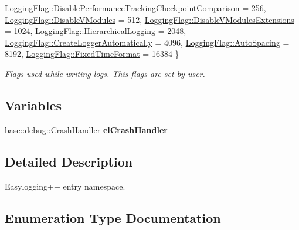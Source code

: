 \begin{DoxyCompactItemize}
\newline
\hyperlink{namespaceel_a2784aacd04cb7816ac1c0b20fcbf83cba18ea5964e8caa7c476dd5eee8e4f74a0}{Logging\+Flag\+::\+Disable\+Performance\+Tracking\+Checkpoint\+Comparison} = 256, 
\hyperlink{namespaceel_a2784aacd04cb7816ac1c0b20fcbf83cba22cae5066e8e0623cb90e20a18abb631}{Logging\+Flag\+::\+Disable\+V\+Modules} = 512, 
\hyperlink{namespaceel_a2784aacd04cb7816ac1c0b20fcbf83cba18a8e65b84ca0cc82451b5e155d7aeb4}{Logging\+Flag\+::\+Disable\+V\+Modules\+Extensions} = 1024, 
\hyperlink{namespaceel_a2784aacd04cb7816ac1c0b20fcbf83cba477de0500d7a5b64a4500d82811fc058}{Logging\+Flag\+::\+Hierarchical\+Logging} = 2048, 
\newline
\hyperlink{namespaceel_a2784aacd04cb7816ac1c0b20fcbf83cba2afa5afe77105aadedcbb90dd8547cc3}{Logging\+Flag\+::\+Create\+Logger\+Automatically} = 4096, 
\hyperlink{namespaceel_a2784aacd04cb7816ac1c0b20fcbf83cba34620f140246d3c3b68c17fdf7b8ada7}{Logging\+Flag\+::\+Auto\+Spacing} = 8192, 
\hyperlink{namespaceel_a2784aacd04cb7816ac1c0b20fcbf83cbaebbb601e28e0cf821dfe13b4a7cf409e}{Logging\+Flag\+::\+Fixed\+Time\+Format} = 16384
 \}\begin{DoxyCompactList}\small\item\em Flags used while writing logs. This flags are set by user. \end{DoxyCompactList}
\end{DoxyCompactItemize}
\subsection*{Variables}
\begin{DoxyCompactItemize}
\item 
\mbox{\label{namespaceel_ab9770514f33aef6683dbba37be2b471d}} 
\hyperlink{classel_1_1base_1_1debug_1_1_crash_handler}{base\+::debug\+::\+Crash\+Handler} {\bfseries el\+Crash\+Handler}
\end{DoxyCompactItemize}


\subsection{Detailed Description}
Easylogging++ entry namespace. 

\subsection{Enumeration Type Documentation}
\mbox{\label{namespaceel_a281f5db6d6163678bc68a8b23b59e124}} 
